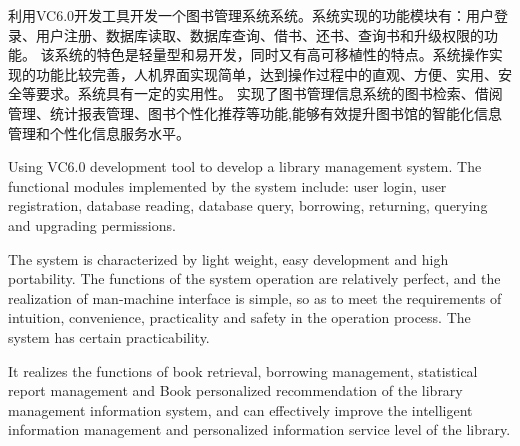 \thispagestyle{empty}
\renewcommand{\baselinestretch}{1.5}  %

\begin{cnabstract}
利用VC6.0开发工具开发一个图书管理系统系统。系统实现的功能模块有：用户登录、用户注册、数据库读取、数据库查询、借书、还书、查询书和升级权限的功能。
该系统的特色是轻量型和易开发，同时又有高可移植性的特点。系统操作实现的功能比较完善，人机界面实现简单，达到操作过程中的直观、方便、实用、安全等要求。系统具有一定的实用性。
实现了图书管理信息系统的图书检索、借阅管理、统计报表管理、图书个性化推荐等功能,能够有效提升图书馆的智能化信息管理和个性化信息服务水平。
\end{cnabstract}
\par
\vspace*{2em}





\begin{enabstract}
Using VC6.0 development tool to develop a library management system. The functional modules implemented by the system include: user login, user registration, database reading, database query, borrowing, returning, querying and upgrading permissions.

The system is characterized by light weight, easy development and high portability. The functions of the system operation are relatively perfect, and the realization of man-machine interface is simple, so as to meet the requirements of intuition, convenience, practicality and safety in the operation process. The system has certain practicability.

It realizes the functions of book retrieval, borrowing management, statistical report management and Book personalized recommendation of the library management information system, and can effectively improve the intelligent information management and personalized information service level of the library.
\end{enabstract}
\par
\vspace*{2em}
